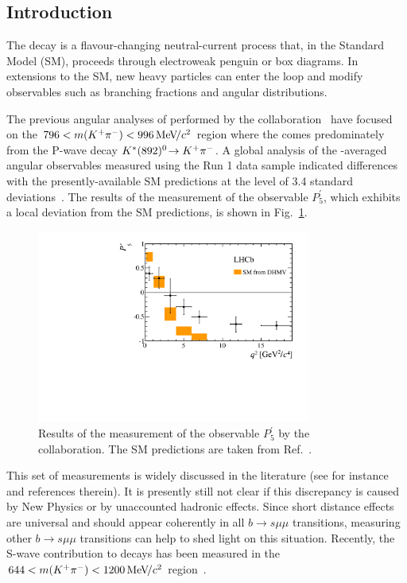 \subsection{Introduction}
\label{sec:kpimm:introduction}

The decay \BdToKpimm is a flavour-changing neutral-current process that, in the Standard Model (SM), proceeds through electroweak penguin or box diagrams.  In extensions to the SM, new heavy particles can enter the loop and modify observables such as branching fractions and angular distributions.

The previous angular analyses of \BdToKpimm performed by the \lhcb collaboration~\cite{kstmm-0.3fb,kstmm-1fb,kstmm-1fb-pprime,kstmm-3fb} have focused on the $796<m({{K}^+}{{\pi}^-})<996{\mathrm{\,Me\kern -0.1em V\!/}c^2}$ region where the \kpi comes predominately from the P-wave decay ${{K}^*}(892)^{0}\!\rightarrow {\ensuremath{{K}^+}}{\ensuremath{{\pi}^-}}$. 
A global analysis of the \CP-averaged angular observables measured using the \lhcb Run 1 data sample indicated differences with the presently-available SM predictions at the level of 3.4 standard deviations~\cite{kstmm-3fb}. The results of the measurement of the observable $P_{5}^{'}$, which exhibits a local deviation from the SM predictions, is shown in Fig.~\ref{fig:kpimm:p5prime}.

\begin{figure}[!b]
\centering
\includegraphics[width=0.8\textwidth]{figs/kpimm/introduction/P5prime.pdf}
\caption{Results of the measurement of the observable $P_{5}^{'}$ by the \lhcb collaboration. The SM predictions are taken from Ref.~\cite{pprime-theory}.}
\label{fig:kpimm:p5prime}
\end{figure}

This set of measurements is widely discussed in the literature (see for instance \cite{DescotesGenon:2013wba,Beaujean:2013soa,Crivellin:2015mga,Lyon:2014hpa} and references therein). It is presently still not clear if this discrepancy is caused by New Physics or by unaccounted hadronic effects. 
Since short distance effects are universal and should appear coherently in all $b\to s \mu\mu$ transitions, measuring other $b\to s\mu\mu$ transitions can help to shed light on this situation. Recently, the S-wave contribution to \BdToKpimm decays has been measured in the $644<m({{K}^+}{{\pi}^-})<1200{\mathrm{\,Me\kern -0.1em V\!/}c^2}$ region~\cite{s-wave}. 

